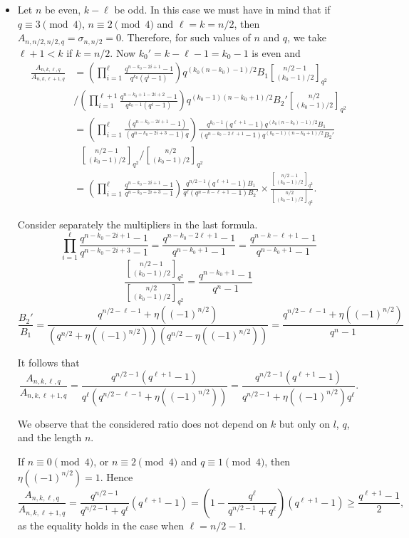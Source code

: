\documentclass[a4paper,11pt]{article}
\begin{document}
\begin{itemize}
\item Let $n$ be even, $k-\ell$ be odd. In this case we must have in mind that if $q\equiv 3\pmod 4$, $n\equiv 2\pmod 4$ and $\ell=k=n/2$, then $A_{n,n/2,n/2,q}=\sigma_{n,n/2}=0$.
Therefore, for such values of $n$ and $q$, we take $\ell+1<k$ if $k=n/2$.
Now $k_0'=k-\ell-1=k_0-1$ is even and
\begin{align*}
  \frac{A_{n,k,\ell,q}}{A_{n,k,\ell+1,q}} & =\left(\prod_{i=1}^\ell\frac{q^{n-k_0-2i+1}-1}{q^{k_0}(q^i-1)}\right)q^{(k_0(n-k_0)-1)/2}B_1{n/2-1\brack(k_0-1)/2 }_{q^2}\\ &/\left(\prod_{i=1}^{\ell+1}\frac{q^{n-k_0+1-2i+2}-1}{q^{k_0-1}(q^i-1)}\right)q^{(k_0-1)(n-k_0+1)/2}B_2'{n/2\brack (k_0-1)/2 }_{q^2} \\
   &=\left(\prod_{i=1}^\ell\frac{(q^{n-k_0-2i+1}-1)}{(q^{n-k_0-2i+3}-1)q}\right)\frac{q^{k_0-1}(q^{\ell+1}-1)q^{(k_0(n-k_0)-1)/2}B_1}{(q^{n-k_0-2\ell+1}-1)q^{(k_0-1)(n-k_0+1)/2}B_2'}\\
   &~~~{n/2-1\brack(k_0-1)/2 }_{q^2}/{n/2\brack (k_0-1)/2 }_{q^2} \\
   &=\left(\prod_{i=1}^\ell\frac{q^{n-k_0-2i+1}-1}{q^{n-k_0-2i+3}-1}\right)\frac{q^{n/2-1}(q^{\ell+1}-1)B_1}{q^{\ell}(q^{n-k-\ell+1}-1)B_2'}\times\frac{{n/2-1\brack(k_0-1)/2 }_{q^2}}{{n/2\brack (k_0-1)/2 }_{q^2}}.
\end{align*}

Consider separately the multipliers in the last formula.
$$\prod_{i=1}^\ell\frac{q^{n-k_0-2i+1}-1}{q^{n-k_0-2i+3}-1}=\frac{q^{n-k_0-2\ell+1}-1}{q^{n-k_0+1}-1}=\frac{q^{n-k-\ell+1}-1}{q^{n-k_0+1}-1}$$
$$\frac{{n/2-1\brack(k_0-1)/2 }_{q^2}}{{n/2\brack (k_0-1)/2 }_{q^2}}=\frac{q^{n-k_0+1}-1}{q^n-1}$$
$$\frac{B_2'}{B_1}=\frac{q^{n/2-\ell-1}+\eta((-1)^{n/2})}{(q^{n/2}+\eta((-1)^{n/2}))(q^{n/2}-\eta((-1)^{n/2}))}=\frac{q^{n/2-\ell-1}+\eta((-1)^{n/2})}{q^{n}-1}$$

It follows that
$$\frac{A_{n,k,\ell,q}}{A_{n,k,\ell+1,q}}=\frac{q^{n/2-1}(q^{\ell+1}-1)}{q^{\ell}(q^{n/2-\ell-1}+\eta((-1)^{n/2}))}=\frac{q^{n/2-1}(q^{\ell+1}-1)}{q^{n/2-1}+\eta((-1)^{n/2})q^\ell}.$$

We observe that the considered ratio does not depend on $k$ but only on $l$, $q$, and the length $n$.

If $n\equiv 0\pmod 4$, or $n\equiv 2\pmod 4$ and $q\equiv 1\pmod 4$, then $\eta((-1)^{n/2})=1$. Hence
$$\frac{A_{n,k,\ell,q}}{A_{n,k,\ell+1,q}}= \frac{q^{n/2-1}}{q^{n/2-1}+q^\ell}(q^{\ell+1}-1)=(1-\frac{q^{\ell}}{q^{n/2-1}+q^\ell})(q^{\ell+1}-1)\ge \frac{q^{\ell+1}-1}{2},$$
as the equality holds in the case when $\ell=n/2-1$.


\end{itemize}
\end{document}
